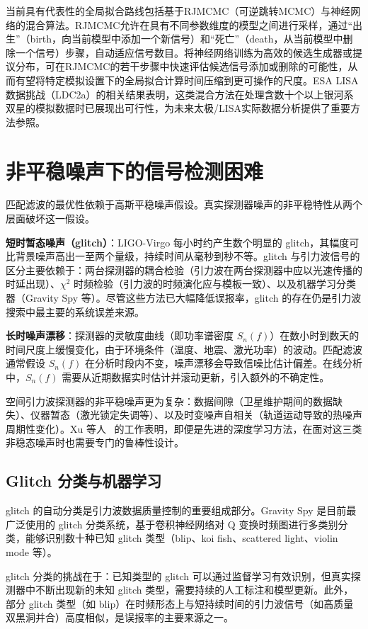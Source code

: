 当前具有代表性的全局拟合路线包括基于RJMCMC（可逆跳转MCMC）与神经网络的混合算法。RJMCMC允许在具有不同参数维度的模型之间进行采样，通过“出生”（birth，向当前模型中添加一个新信号）和“死亡”（death，从当前模型中删除一个信号）步骤，自动适应信号数目。将神经网络训练为高效的候选生成器或提议分布，可在RJMCMC的若干步骤中快速评估候选信号添加或删除的可能性，从而有望将特定模拟设置下的全局拟合计算时间压缩到更可操作的尺度。ESA LISA数据挑战（LDC2a）的相关结果表明，这类混合方法在处理含数十个以上银河系双星的模拟数据时已展现出可行性，为未来太极/LISA实际数据分析提供了重要方法参照。

\section{非平稳噪声下的信号检测困难}

匹配滤波的最优性依赖于高斯平稳噪声假设。真实探测器噪声的非平稳特性从两个层面破坏这一假设。

\textbf{短时暂态噪声（glitch）}：LIGO-Virgo 每小时约产生数个明显的 glitch，其幅度可比背景噪声高出一至两个量级，持续时间从毫秒到秒不等。glitch 与引力波信号的区分主要依赖于：两台探测器的耦合检验（引力波在两台探测器中应以光速传播的时延出现）、$\chi^2$ 时频检验（引力波的时频演化应与模板一致）、以及机器学习分类器（Gravity Spy 等）。尽管这些方法已大幅降低误报率，glitch 的存在仍是引力波搜索中最主要的系统误差来源。

\textbf{长时噪声漂移}：探测器的灵敏度曲线（即功率谱密度 $S_n(f)$）在数小时到数天的时间尺度上缓慢变化，由于环境条件（温度、地震、激光功率）的波动。匹配滤波通常假设 $S_n(f)$ 在分析时段内不变，噪声漂移会导致信噪比估计偏差。在线分析中，$S_n(f)$ 需要从近期数据实时估计并滚动更新，引入额外的不确定性。

空间引力波探测器的非平稳噪声更为复杂：数据间隙（卫星维护期间的数据缺失）、仪器暂态（激光锁定失调等）、以及时变噪声自相关（轨道运动导致的热噪声周期性变化）。Xu 等人~\cite{xu2024nonstationarty} 的工作表明，即便是先进的深度学习方法，在面对这三类非稳态噪声时也需要专门的鲁棒性设计。

\subsection{Glitch 分类与机器学习}

glitch 的自动分类是引力波数据质量控制的重要组成部分。Gravity Spy 是目前最广泛使用的 glitch 分类系统，基于卷积神经网络对 Q 变换时频图进行多类别分类，能够识别数十种已知 glitch 类型（blip、koi fish、scattered light、violin mode 等）。

glitch 分类的挑战在于：已知类型的 glitch 可以通过监督学习有效识别，但真实探测器中不断出现新的未知 glitch 类型，需要持续的人工标注和模型更新。此外，部分 glitch 类型（如 blip）在时频形态上与短持续时间的引力波信号（如高质量双黑洞并合）高度相似，是误报率的主要来源之一。

